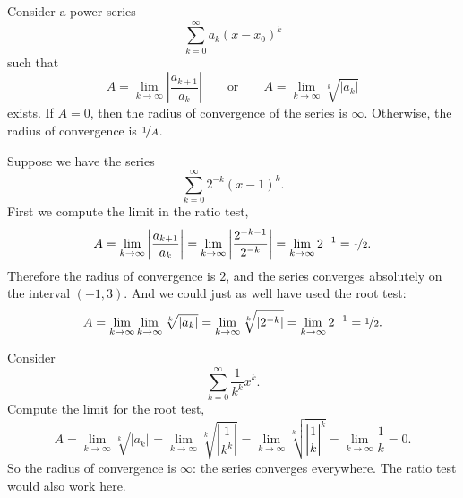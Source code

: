 \begin{theorem}
Consider a power series
\begin{equation*}
\sum_{k=0}^\infty a_k {(x-x_0)}^k
\end{equation*}
such that
\begin{equation*}
A =
\lim_{k\to\infty}
\left \lvert
\frac{a_{k+1}}{a_k}
\right \rvert
\qquad \text{or} \qquad
A =
\lim_{k\to\infty} \sqrt[k]{\lvert a_k \rvert}
\end{equation*}
exists.  If $A = 0$, then the radius of convergence of the series
is $\infty$.  Otherwise, the radius of convergence is $\nicefrac{1}{A}$.
\pagebreak[3]
\end{theorem}

\begin{example}
Suppose we have the series
\begin{equation*}
\sum_{k=0}^\infty 2^{-k} {(x-1)}^k .
\end{equation*}
First we compute the limit in the ratio test,
\begin{equation*}
A = \lim_{k\to\infty} 
\left \lvert
\frac{a_{k+1}}{a_k}
\right \rvert
=
\lim_{k\to\infty} 
\left \lvert
\frac{2^{-k-1}}{2^{-k}}
\right \rvert
=
\lim_{k\to\infty} 
2^{-1} = \nicefrac{1}{2}.
\end{equation*}
Therefore the radius of convergence is $2$, and the series
converges absolutely on the interval $(-1,3)$.
And we could just as well have used the root test:
\begin{equation*}
A = \lim_{k\to\infty} 
\lim_{k\to\infty} 
\sqrt[k]{\lvert
a_k
\rvert}
=
\lim_{k\to\infty} 
\sqrt[k]{\lvert
2^{-k}
\rvert}
=
\lim_{k\to\infty} 
2^{-1}
=
\nicefrac{1}{2}.
\end{equation*}
\end{example}

\begin{example}
Consider
\begin{equation*}
\sum_{k=0}^\infty \frac{1}{k^k} {x}^k .
\end{equation*}
Compute the limit for the root test,
\begin{equation*}
A =
\lim_{k\to\infty} 
\sqrt[k]{\lvert a_k \rvert}
=
\lim_{k\to\infty} 
\sqrt[k]{
\left\lvert\frac{1}{k^k}\right\rvert}
=
\lim_{k\to\infty} 
\sqrt[k]{
{\left\lvert\frac{1}{k}\right\rvert}^{k}}
=
\lim_{k\to\infty} 
\frac{1}{k}
=
0 .
\end{equation*}
So the radius of convergence is $\infty$: the series
converges everywhere.  The ratio test would also work here.
\end{example}

